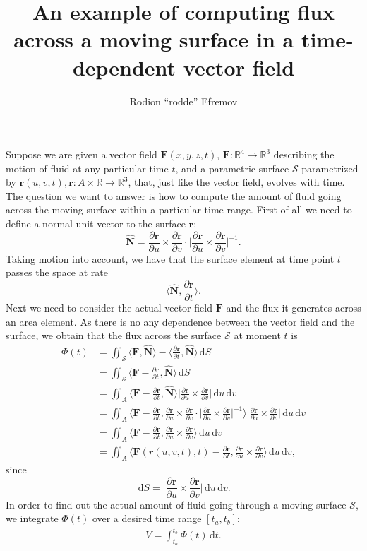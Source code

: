 \documentclass[12pt]{article}
\title{An example of computing flux across a moving surface in a time-dependent vector field}
\author{Rodion ``rodde'' Efremov}
\newcommand{\F}{\mathbf{F}}
\newcommand{\surf}{\mathbf{r}}
\newcommand{\N}{\hat{\mathbf{N}}}
\newcommand{\R}{\mathbb{R}}
\newcommand{\dr}{\partial \surf}
\newcommand{\du}{\partial u}
\newcommand{\dv}{\partial v}
\newcommand{\dt}{\partial t}
\newcommand{\dru}{\frac{\dr}{\du}}
\newcommand{\drv}{\frac{\dr}{\dv}}
\newcommand{\drt}{\frac{\dr}{\dt}}
\newcommand{\dS}{\,\mathrm{d}S}
\newcommand{\ddt}{\,\mathrm{d}t}
\newcommand{\ddu}{\, \mathrm{d}u}
\newcommand{\ddv}{\, \mathrm{d}v}
\begin{document}
 \maketitle

\noindent Suppose we are given a vector field $\F(x, y, z, t), \, \F \colon \R^4 \to \R^3$ describing the motion of fluid at any particular time $t$, and a parametric surface $\mathscr{S}$ parametrized by $\surf (u, v, t), \surf \colon A \times \R \to \R^3$, that, just like the vector field, evolves with time. The question we want to answer is how to compute the amount of fluid going across the moving surface within a particular time range. First of all we need to define a normal unit vector to the surface $\surf$:
\[
\N = \dru \times \drv \cdot \Bigg| \dru \times \drv \Bigg|^{-1}.
\]
Taking motion into account, we have that the surface element at time point $t$ passes the space at rate 
\[
\Big\langle \N , \drt \Big\rangle.
\]
Next we need to consider the actual vector field $\F$ and the flux it generates across an area element. As there is no any dependence between the vector field and the surface, we obtain that the flux across the surface $\mathscr{S}$ at moment $t$ is
\begin{align*}
\Phi(t) &= \iint_{\mathscr{S}} \langle \F, \N \rangle - \langle \drt, \N \rangle \dS \\
		   &= \iint_{\mathscr{S}} \langle \F - \drt, \N \rangle \dS \\
		   &= \iint_A \langle \F - \drt, \N \rangle \Bigg| \dru \times \drv \Bigg| \ddu \ddv \\ 
		   &= \iint_A \Bigg\langle \F - \drt, \dru \times \drv \cdot \Bigg| \dru \times \drv \Bigg|^{-1} \Bigg\rangle \Bigg| \dru \times \drv \Bigg| \ddu \ddv \\ 
		   &= \iint_A \Bigg\langle \F - \drt, \dru \times \drv \Bigg\rangle \ddu \ddv \\
		   &= \iint_A \Bigg\langle \F(r(u, v, t), t) - \drt, \dru \times \drv \Bigg\rangle \ddu \ddv,
\end{align*}
since
\[
\dS = \Bigg| \dru \times \drv \Bigg| \ddu \ddv.
\]
In order to find out the actual amount of fluid going through a moving surface $\mathscr{S}$, we integrate $\Phi(t)$ over a desired time range $\left[ t_a, t_b \right]$:
\begin{align*}
V = \int_{t_a}^{t_b} \Phi(t) \ddt.
\end{align*}
\end{document}
